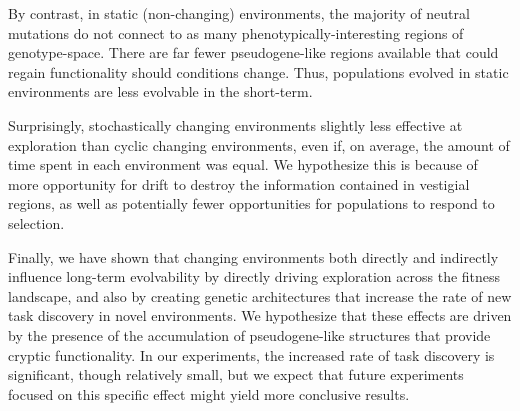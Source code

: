 \documentclass[PhD]{msu-thesis}
\begin{document}
By contrast, in static (non-changing) environments, the majority of neutral mutations do not connect to as many phenotypically-interesting regions of genotype-space. There are far fewer pseudogene-like regions available that could regain functionality should conditions change. Thus, populations evolved in static environments are less evolvable in the short-term.

Surprisingly, stochastically changing environments slightly less effective at exploration
than cyclic changing environments, even if, on average, the amount of time spent in each environment was equal. We hypothesize this is because of more opportunity for drift to destroy the information contained in vestigial regions, as well as potentially fewer opportunities for populations to respond to selection.

Finally, we have shown that changing environments both directly and indirectly influence long-term evolvability by directly driving exploration across the fitness landscape, and also by creating genetic architectures that increase the rate of new task discovery in novel environments. We hypothesize that these effects are driven by the presence of the accumulation of pseudogene-like structures that provide cryptic functionality. In our experiments, the increased rate of task discovery is significant, though relatively small, but we expect that future experiments focused on this specific effect might yield more conclusive results. 
\end{document}
